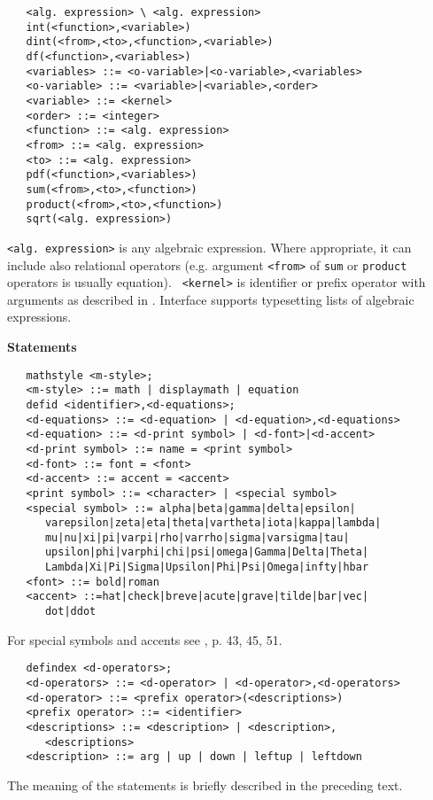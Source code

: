 \begin{verbatim}
   <alg. expression> \ <alg. expression>
   int(<function>,<variable>)
   dint(<from>,<to>,<function>,<variable>)
   df(<function>,<variables>)
   <variables> ::= <o-variable>|<o-variable>,<variables>
   <o-variable> ::= <variable>|<variable>,<order>
   <variable> ::= <kernel>
   <order> ::= <integer>
   <function> ::= <alg. expression>
   <from> ::= <alg. expression>
   <to> ::= <alg. expression>
   pdf(<function>,<variables>)
   sum(<from>,<to>,<function>)
   product(<from>,<to>,<function>)
   sqrt(<alg. expression>)
\end{verbatim}

{\tt <alg. expression>} is any algebraic expression. Where appropriate,
it can include also relational operators (e.g. argument {\tt <from>} of
{\tt sum} or {\tt product} operators is usually equation). {\tt
<kernel>} is identifier or prefix operator with arguments as described
in \cite{Hearn:95}. Interface supports typesetting lists of algebraic
expressions.


{\bf Statements}

\begin{verbatim}
   mathstyle <m-style>;
   <m-style> ::= math | displaymath | equation
   defid <identifier>,<d-equations>;
   <d-equations> ::= <d-equation> | <d-equation>,<d-equations>
   <d-equation> ::= <d-print symbol> | <d-font>|<d-accent>
   <d-print symbol> ::= name = <print symbol>
   <d-font> ::= font = <font>
   <d-accent> ::= accent = <accent>
   <print symbol> ::= <character> | <special symbol>
   <special symbol> ::= alpha|beta|gamma|delta|epsilon|
      varepsilon|zeta|eta|theta|vartheta|iota|kappa|lambda|
      mu|nu|xi|pi|varpi|rho|varrho|sigma|varsigma|tau|
      upsilon|phi|varphi|chi|psi|omega|Gamma|Delta|Theta|
      Lambda|Xi|Pi|Sigma|Upsilon|Phi|Psi|Omega|infty|hbar
   <font> ::= bold|roman
   <accent> ::=hat|check|breve|acute|grave|tilde|bar|vec|
      dot|ddot
\end{verbatim}

For special symbols and accents see \cite{Lamport:86}, p. 43, 45, 51.

\begin{verbatim}
   defindex <d-operators>;
   <d-operators> ::= <d-operator> | <d-operator>,<d-operators>
   <d-operator> ::= <prefix operator>(<descriptions>)
   <prefix operator> ::= <identifier>
   <descriptions> ::= <description> | <description>,
      <descriptions>
   <description> ::= arg | up | down | leftup | leftdown
\end{verbatim}

The meaning of the statements is briefly described in the preceding
text.



